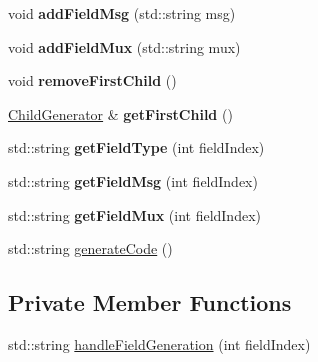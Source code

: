 \begin{DoxyCompactItemize}
\item 
\hypertarget{classChildGenerator_a4f250d173bc5495679e0bf50b6b9bfd0}{void {\bfseries add\-Field\-Msg} (std\-::string msg)}\label{classChildGenerator_a4f250d173bc5495679e0bf50b6b9bfd0}

\item 
\hypertarget{classChildGenerator_a8e6cfd5d9573009475a1154d979e8e59}{void {\bfseries add\-Field\-Mux} (std\-::string mux)}\label{classChildGenerator_a8e6cfd5d9573009475a1154d979e8e59}

\item 
\hypertarget{classChildGenerator_a52e17e0807904531c7d74c3312c419c0}{void {\bfseries remove\-First\-Child} ()}\label{classChildGenerator_a52e17e0807904531c7d74c3312c419c0}

\item 
\hypertarget{classChildGenerator_aac1dd1a96778db140c1a4c60df40608b}{\hyperlink{classChildGenerator}{Child\-Generator} \& {\bfseries get\-First\-Child} ()}\label{classChildGenerator_aac1dd1a96778db140c1a4c60df40608b}

\item 
\hypertarget{classChildGenerator_aafdee6300b9422ce5521655bcd7ccb9f}{std\-::string {\bfseries get\-Field\-Type} (int field\-Index)}\label{classChildGenerator_aafdee6300b9422ce5521655bcd7ccb9f}

\item 
\hypertarget{classChildGenerator_ac2d36434a7f395b245f7e0719b5cba6b}{std\-::string {\bfseries get\-Field\-Msg} (int field\-Index)}\label{classChildGenerator_ac2d36434a7f395b245f7e0719b5cba6b}

\item 
\hypertarget{classChildGenerator_af05c7bf865614b4e047737969f1bf2ab}{std\-::string {\bfseries get\-Field\-Mux} (int field\-Index)}\label{classChildGenerator_af05c7bf865614b4e047737969f1bf2ab}

\item 
std\-::string \hyperlink{classChildGenerator_a2dd3b214edfe346d16c8c2cdc708cc52}{generate\-Code} ()
\end{DoxyCompactItemize}
\subsection*{Private Member Functions}
\begin{DoxyCompactItemize}
\item 
std\-::string \hyperlink{classChildGenerator_a714d69356bb97be6914758a8d5c7636c}{handle\-Field\-Generation} (int field\-Index)
\end{DoxyCompactItemize}
